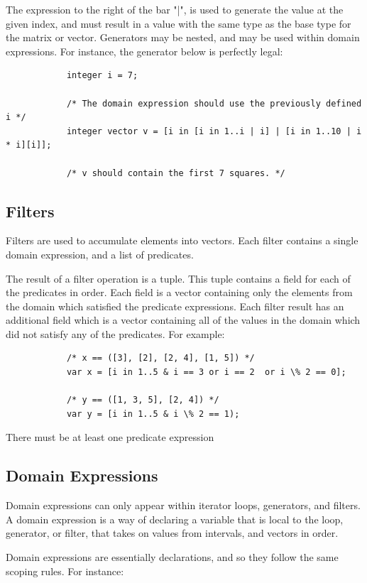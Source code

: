 \documentclass{article}
\begin{document}
		The expression to the right of the bar "|", is used to generate the value at the given index, and must result in
		a value with the same type as the base type for the matrix or vector. Generators may be nested, and may be used
		within domain expressions. For instance, the generator below is perfectly legal:

		\begin{lstlisting}
			integer i = 7;

			/* The domain expression should use the previously defined i */
			integer vector v = [i in [i in 1..i | i] | [i in 1..10 | i * i][i]];

			/* v should contain the first 7 squares. */
		\end{lstlisting}


	\subsection{Filters}\label{sec:filters}

		Filters are used to accumulate elements into vectors. Each filter contains a single domain expression, and a
		list of predicates.

		The result of a filter operation is a tuple. This tuple contains a field for each of the predicates in order.
		Each field is a vector containing only the elements from the domain which satisfied the predicate expressions.
		Each filter result has an additional field which is a vector containing all of the values in the domain which
		did not satisfy any of the predicates. For example:

		\begin{lstlisting}
			/* x == ([3], [2], [2, 4], [1, 5]) */
			var x = [i in 1..5 & i == 3 or i == 2  or i \% 2 == 0];

			/* y == ([1, 3, 5], [2, 4]) */
			var y = [i in 1..5 & i \% 2 == 1);
		\end{lstlisting}

		There must be at least one predicate expression

	\subsection{Domain Expressions}
		Domain expressions can only appear within iterator loops, generators, and filters. A domain expression is a way
		of declaring a variable that is local to the loop, generator, or filter, that takes on values from intervals,
		and vectors in order.

		Domain expressions are essentially declarations, and so they follow the same scoping rules. For instance:
\end{document}
